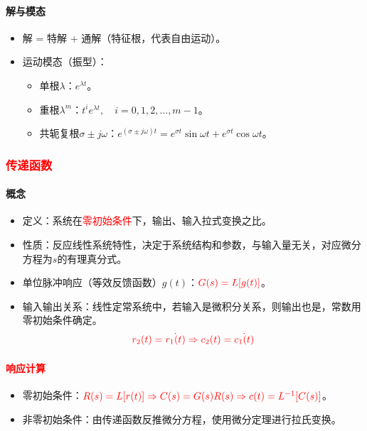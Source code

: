 \documentclass[
12pt, %
a4paper, 
oneside, %
]{scrartcl}
\begin{document}
\paragraph{解与模态}
\begin{itemize}
\item 解 = 特解 + 通解（特征根，代表自由运动）。
\item 运动模态（振型）：
\begin{itemize}
\item 单根$ \lambda $：$ e^{\lambda t} $。
\item 重根$ \lambda^m $：$ t^i e^{\lambda t}, \quad i = 0, 1, 2, \dots, m - 1 $。
\item 共轭复根$ \sigma \pm j \omega $：$ e^{(\sigma \pm j \omega)t} = e^{\sigma t} \sin \omega t + e^{\sigma t} \cos \omega t $。
\end{itemize}
\end{itemize}
\subsubsection[传递函数]{\textcolor{red}{传递函数}}
\paragraph{概念}
\begin{itemize}
\item 定义：系统在\textcolor{red}{零初始条件}下，输出、输入拉式变换之比。
\item 性质：反应线性系统特性，决定于系统结构和参数，与输入量无关，对应微分方程为$ s $的有理真分式。
\item 单位脉冲响应（等效反馈函数）$ g(t) $：$ \textcolor{red}{G(s) = L[g(t)]} $。
\item 输入输出关系：线性定常系统中，若输入是微积分关系，则输出也是，常数用零初始条件确定。
$$ \textcolor{red}{r_2(t) = \dot{r_1(t)} \Rightarrow c_2(t) = \dot{c_1(t)}} $$
\end{itemize}
\paragraph{\textcolor{red}{响应计算}}
\begin{itemize}
\item 零初始条件：$ \textcolor{red}{ R(s) = L[r(t)] \Rightarrow C(s) = G(s)R(s) \Rightarrow c(t) = L^{-1}[C(s)]} $。
\item 非零初始条件：由传递函数反推微分方程，使用微分定理进行拉氏变换。
\end{itemize}
\end{document}
